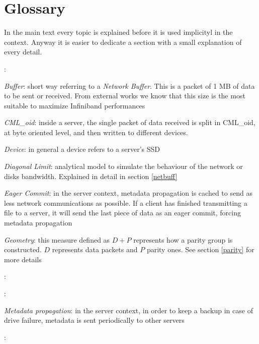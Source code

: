 \section{Glossary}
In the main text every topic is explained before it is used implicityl in the
context. Anyway it is easier to dedicate a section with a small explanation of
every detail.

\textit{}:
\vspace{10pt}

\textit{Buffer}: short way referring to a \textit{Network Buffer}. This is a
packet of 1 MB of data to be sent or received. From external works we know that
this size is the most suitable to maximize Infiniband performances\vspace{10pt}

\textit{CML\_oid}: inside a server, the single packet of data received is split
in CML\_oid, at byte oriented level, and then written to different devices.
\vspace{10pt}

\textit{Device}: in general a device refers to a server's SSD
\vspace{10pt}

\textit{Diagonal Limit}: analytical model to simulate the behaviour of the
network or disks bandwidth. Explained in detail in section \ref{netbuff}
\vspace{10pt}

\textit{Eager Commit}: in the server context, metadata propagation is cached to
send as less network communications as possible. If a client has finished
transmitting a file to a server, it will send the last piece of data as an eager
commit, forcing metadata propagation
\vspace{10pt}

\textit{Geometry}: this measure defined as $D+P$ represents how a parity group
is constructed. $D$ represents data packets and $P$ parity ones. See section
\ref{parity} for more details
\vspace{10pt}

\textit{}:
\vspace{10pt}

\textit{}:
\vspace{10pt}

\textit{Metadata propagation}: in the server context, in order to keep a backup
in case of drive failure, metadata is sent periodically to other servers
\vspace{10pt}

\textit{}:
\vspace{10pt}

